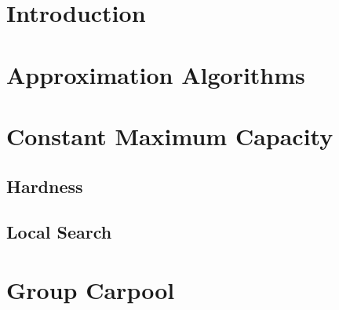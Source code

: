 \section{Introduction}

\section{Approximation Algorithms}
\label{sec:approx}


\section{Constant Maximum Capacity}
\label{sec:cmax}
   \subsection{Hardness}
   \label{sec:hardness}

   \subsection{Local Search}
   \label{sec:local}

\section{Group Carpool}
\label{sec:group}

